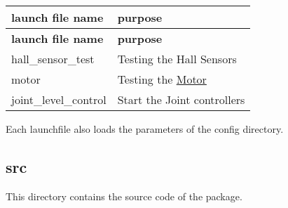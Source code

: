 \tabulinesep=1mm
\begin{longtabu} spread 0pt [c]{*{2}{|X[-1]}|}
\hline
\rowcolor{\tableheadbgcolor}\textbf{ launch file name }&\textbf{ purpose  }\\
\endfirsthead
\hline
\endfoot
\hline
\rowcolor{\tableheadbgcolor}\textbf{ launch file name }&\textbf{ purpose  }\\
\endhead
hall\+\_\+sensor\+\_\+test &Testing the Hall Sensors \\
motor &Testing the \hyperlink{classMotor}{Motor} \\
joint\+\_\+level\+\_\+control &Start the Joint controllers \\
\end{longtabu}
Each launchfile also loads the parameters of the config directory. \hypertarget{index_src_dir}{}\subsection{src}\label{index_src_dir}
This directory contains the source code of the package. 